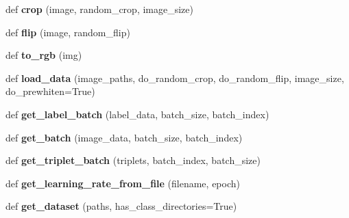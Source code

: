 \begin{DoxyCompactItemize}
\item 
def {\bfseries crop} (image, random\+\_\+crop, image\+\_\+size)\hypertarget{namespacefacenet_a566cf422af34d218be5bece0dd3cc3bf}{}\label{namespacefacenet_a566cf422af34d218be5bece0dd3cc3bf}

\item 
def {\bfseries flip} (image, random\+\_\+flip)\hypertarget{namespacefacenet_aabe975dd0bab8526f1801793a802357f}{}\label{namespacefacenet_aabe975dd0bab8526f1801793a802357f}

\item 
def {\bfseries to\+\_\+rgb} (img)\hypertarget{namespacefacenet_ad4660d94910e620f360b6218736856dc}{}\label{namespacefacenet_ad4660d94910e620f360b6218736856dc}

\item 
def {\bfseries load\+\_\+data} (image\+\_\+paths, do\+\_\+random\+\_\+crop, do\+\_\+random\+\_\+flip, image\+\_\+size, do\+\_\+prewhiten=True)\hypertarget{namespacefacenet_ab514bbfd01b3545290e35c84ee1811e0}{}\label{namespacefacenet_ab514bbfd01b3545290e35c84ee1811e0}

\item 
def {\bfseries get\+\_\+label\+\_\+batch} (label\+\_\+data, batch\+\_\+size, batch\+\_\+index)\hypertarget{namespacefacenet_a66df4716495582a9c75e6a25730b5123}{}\label{namespacefacenet_a66df4716495582a9c75e6a25730b5123}

\item 
def {\bfseries get\+\_\+batch} (image\+\_\+data, batch\+\_\+size, batch\+\_\+index)\hypertarget{namespacefacenet_a39defc57ede0e7947ff03649bc25731a}{}\label{namespacefacenet_a39defc57ede0e7947ff03649bc25731a}

\item 
def {\bfseries get\+\_\+triplet\+\_\+batch} (triplets, batch\+\_\+index, batch\+\_\+size)\hypertarget{namespacefacenet_ad8699592011faac256ff18738d72625c}{}\label{namespacefacenet_ad8699592011faac256ff18738d72625c}

\item 
def {\bfseries get\+\_\+learning\+\_\+rate\+\_\+from\+\_\+file} (filename, epoch)\hypertarget{namespacefacenet_a3575f9424fa72db6e13fed9533e6f082}{}\label{namespacefacenet_a3575f9424fa72db6e13fed9533e6f082}

\item 
def {\bfseries get\+\_\+dataset} (paths, has\+\_\+class\+\_\+directories=True)\hypertarget{namespacefacenet_a4e5a7e85a4d83056dd83906c2be7e6cd}{}\label{namespacefacenet_a4e5a7e85a4d83056dd83906c2be7e6cd}


\end{DoxyCompactItemize}
